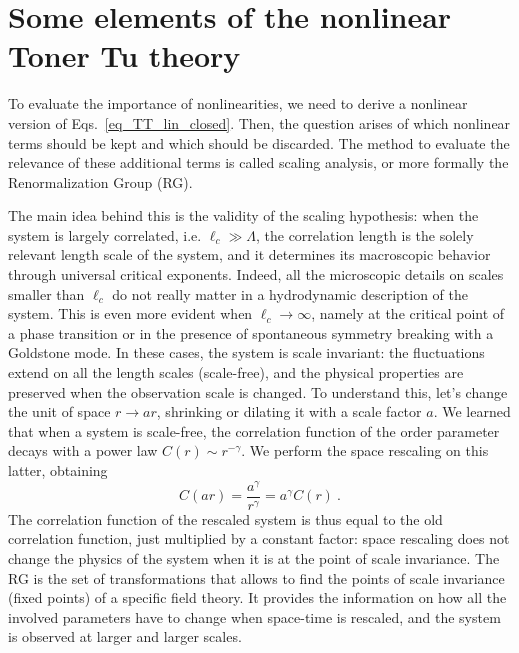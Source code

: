 \section{Some elements of the nonlinear Toner Tu theory}

To evaluate the importance of nonlinearities, we need to derive a nonlinear version of Eqs.~\eqref{eq_TT_lin_closed}.
Then, the question arises of which nonlinear terms should be kept and which should be discarded. The method to evaluate the relevance of these additional terms is called scaling analysis, or more formally the Renormalization Group (RG). 

The main idea behind this is the validity of the scaling hypothesis: when the system is largely correlated, i.e. $\ell_c \gg \Lambda$, the correlation length is the solely relevant length scale of the system, and it determines its macroscopic behavior through universal critical exponents. Indeed, all the microscopic details on scales smaller than $\ell_c$ do not really matter in a hydrodynamic description of the system. This is even more evident when $\ell_c \to \infty$, namely at the critical point of a phase transition or in the presence of spontaneous symmetry breaking with a Goldstone mode. In these cases, the system is scale invariant: the fluctuations extend on all the length scales (scale-free), and the physical properties are preserved when the observation scale is changed. To understand this, let's change the unit of space $r \to a r$, shrinking or dilating it with a scale factor $a$. We learned that when a system is scale-free, the correlation function of the order parameter decays with a power law $C(r) \sim r^{-\gamma}$. We perform the space rescaling on this latter, obtaining
$$
C(ar) = \frac{a^{\gamma}}{r^{\gamma}} = a^{\gamma} C(r) \ .
$$
The correlation function of the rescaled system is thus equal to the old correlation function, just multiplied by a constant factor: space rescaling does not change the physics of the system when it is at the point of scale invariance.  The RG is the set of transformations that allows to find the points of scale invariance (fixed points) of a specific field theory. It provides the information on how all the involved parameters have to change when space-time is rescaled, and the system is observed at larger and larger scales. 

